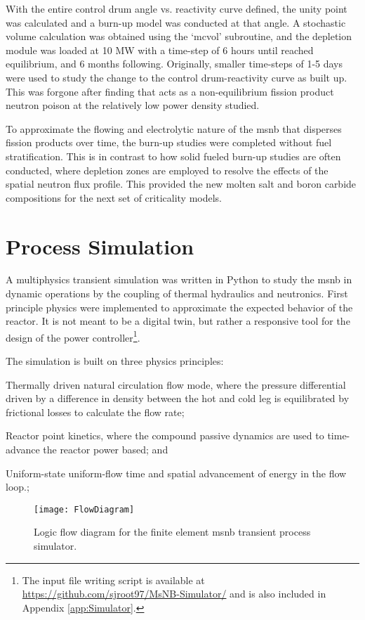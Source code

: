  With the entire control drum angle vs. reactivity curve defined, the unity point was calculated and a burn-up model was conducted at that angle. A stochastic volume calculation was obtained using the `mcvol' subroutine, and the depletion module was loaded at 10 MW with a time-step of 6 hours until \Xe reached equilibrium, and 6 months following. Originally, smaller time-steps of 1-5 days were used to study the change to the control drum-reactivity curve as \Sm built up. This was forgone after finding that \Sm acts as a non-equilibrium fission product neutron poison at the relatively low power density studied. 
 
 To approximate the flowing and electrolytic nature of the \acs{msnb} that disperses fission products over time, the burn-up studies were completed without fuel stratification. This is in contrast to how solid fueled burn-up studies are often conducted, where depletion zones are employed to resolve the effects of the spatial neutron flux profile. This provided the new molten salt and boron carbide compositions for the next set of criticality models.

\section{Process Simulation}\label{Section:Python}
A multiphysics transient simulation was written in Python to study the \acs{msnb} in dynamic operations by the coupling of thermal hydraulics and neutronics. First principle physics were implemented to approximate the expected behavior of the reactor. It is not meant to be a digital twin, but rather a responsive tool for the design of the power controller\footnote{The input file writing script is available at \href{https://github.com/sjroot97/MsNB-Simulator/}{https://github.com/sjroot97/MsNB-Simulator/} and is also included in Appendix \ref{app:Simulator}.}.

The simulation is built on three physics principles: 
\begin{enumerate*}
    \item Thermally driven natural circulation flow mode, where the pressure differential driven by a difference in density between the hot and cold leg is equilibrated by frictional losses to calculate the flow rate;
    \item Reactor point kinetics, where the compound passive dynamics are used to time-advance the reactor power based; and
    \item Uniform-state uniform-flow time and spatial advancement of energy in the flow loop.;
\end{enumerate*}

\begin{figure}[ht!]
    \centering
    \texttt{[image: FlowDiagram]}
    \caption[Process simulator logic flow diagram]{Logic flow diagram for the finite element \acs{msnb} transient process simulator.}
    \label{fig:PythonFlowDiagram}
\end{figure}

